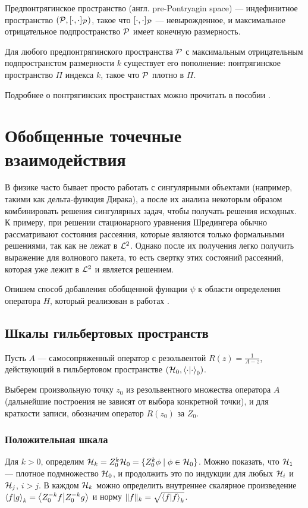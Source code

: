 Предпонтрягинское пространство (англ. pre-Pontryagin space) — индефинитное пространство $(\mathcal{P}, [\cdot,\cdot]_{\mathcal{P}})$, такое что $[\cdot,\cdot]_{\mathcal{P}}$ — невырожденное, и максимальное отрицательное подпространство $\mathcal{P}$ имеет конечную размерность.

Для любого предпонтрягинского пространства $\mathcal{P}$ с максимальным отрицательным подпространстом размерности $k$ существует его пополнение: понтрягинское пространство $\Pi$ индекса $k$, такое что $\mathcal{P}$ плотно в $\Pi$.

Подробнее о понтрягинских пространствах можно прочитать в пособии \cite{azizov_pontryagin}.

\section{Обобщенные точечные взаимодействия}
В физике часто бывает просто работать с сингулярными объектами (например, такими как дельта-функция Дирака), а после их анализа некоторым образом комбинировать решения сингулярных задач, чтобы получать решения исходных. К примеру, при решении стационарного уравнения Шредингера обычно рассматривают состояния рассеяния, которые являются только формальными решениями, так как не лежат в $\mathcal{L}^2$. Однако после их получения легко получить выражение для волнового пакета, то есть свертку этих состояний рассеяний, которая уже лежит в $\mathcal{L}^2$ и является решением.

Опишем способ добавления обобщенной функции $\psi$ к области определения оператора $H$, который реализован в работах \cite{van1991scattering, dijksma2000self, dijksma2000singular}.

\subsection{Шкалы гильбертовых пространств}
Пусть $A$ — самосопряженный оператор с резольвентой $R(z) = \frac{1}{A - z}$, действующий в гильбертовом пространстве $(\hilb{0}, \ipcdot_0)$.

Выберем произвольную точку $z_0$ из резольвентного множества оператора $A$ (дальнейшие построения не зависят от выбора конкретной точки), и для краткости записи, обозначим оператор $R(z_0)$ за $Z_0$.

\subsubsection{Положительная шкала}
Для $k > 0$, определим $\mathcal{H}_{k} = Z_0^k \mathcal{H}_{0} = \{ Z_0^k \phi \mid \phi \in \mathcal{H}_{0} \}$. Можно показать, что $\mathcal{H}_{1}$ — плотное подмножество $\mathcal{H}_{0}$, и продолжить это по индукции для любых $\mathcal{H}_{i}$ и $\mathcal{H}_{j}$, $i > j$. В каждом $\mathcal{H}_{k}$ можно определить внутреннее скалярное произведение $\ip{f}{g}_k = \ip{Z_0^{-k} f}{Z_0^{-k} g}$ и норму $\|f\|_k = \sqrt{\ip{f}{f}_k}$.

